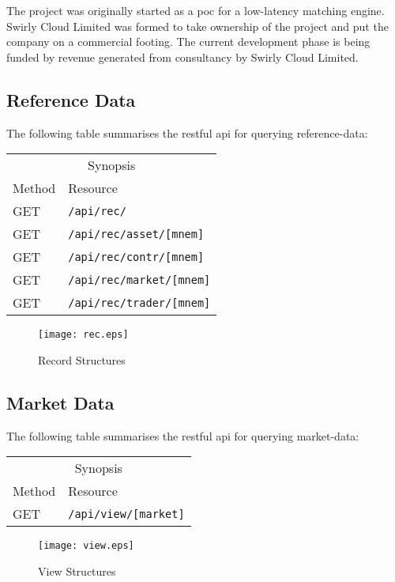\documentclass[11pt,a4paper]{article}
\newcommand{\scltd}{Swirly Cloud Limited\cite{swirlycloud:www}}
\begin{document}
The project was originally started as a \gls{poc} for a low-latency \gls{matching engine}. \scltd{}
was formed to take ownership of the project and put the company on a commercial footing. The current
development phase is being funded by revenue generated from consultancy by \scltd{}.

\subsection{Reference Data}

The following table summarises the \gls{restful} \gls{api} for querying reference-data:

\vspace{5mm}
\begin{tabular}{ll}
\multicolumn{2}{c}{Synopsis}\\
Method&Resource\\
\hline
GET&\texttt{/api/rec/}\\
GET&\texttt{/api/rec/asset/[mnem]}\\
GET&\texttt{/api/rec/contr/[mnem]}\\
GET&\texttt{/api/rec/market/[mnem]}\\
GET&\texttt{/api/rec/trader/[mnem]}\\
\end{tabular}
\vspace{5mm}

\begin{figure}[H]
\centering
\texttt{[image: rec.eps]}
\caption{Record Structures}
\end{figure}

\subsection{Market Data}

The following table summarises the \gls{restful} \gls{api} for querying market-data:

\vspace{5mm}
\begin{tabular}{ll}
\multicolumn{2}{c}{Synopsis}\\
Method&Resource\\
\hline
GET&\texttt{/api/view/[market]}\\
\end{tabular}
\vspace{5mm}

\begin{figure}[H]
\centering
\texttt{[image: view.eps]}
\caption{View Structures}
\end{figure}
\end{document}
